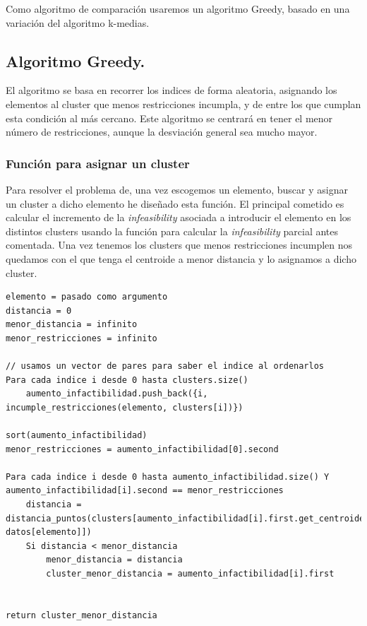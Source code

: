 \documentclass[12pt, spanish]{article}
\begin{document}
Como algoritmo de comparación usaremos un algoritmo Greedy, basado en una variación del algoritmo k-medias.

\subsection{Algoritmo Greedy.}

El algoritmo se basa en recorrer los indices de forma aleatoria, asignando los elementos al cluster que menos restricciones incumpla, y de entre los que cumplan esta condición al más cercano. Este algoritmo se centrará en tener el menor número de restricciones, aunque la desviación general sea mucho mayor.

\subsubsection{Función para asignar un cluster}

Para resolver el problema de, una vez escogemos un elemento, buscar y asignar un cluster a dicho elemento he diseñado esta función. El principal cometido es calcular el incremento de la \textit{infeasibility} asociada a introducir el elemento en los distintos clusters usando la función para calcular la \textit{infeasibility} parcial antes comentada. Una vez tenemos los clusters que menos restricciones incumplen nos quedamos con el que tenga el centroide a menor distancia y lo asignamos a dicho cluster.


\begin{lstlisting}
elemento = pasado como argumento
distancia = 0
menor_distancia = infinito
menor_restricciones = infinito

// usamos un vector de pares para saber el indice al ordenarlos
Para cada indice i desde 0 hasta clusters.size()
	aumento_infactibilidad.push_back({i, incumple_restricciones(elemento, clusters[i])})

sort(aumento_infactibilidad)
menor_restricciones = aumento_infactibilidad[0].second

Para cada indice i desde 0 hasta aumento_infactibilidad.size() Y aumento_infactibilidad[i].second == menor_restricciones
	distancia = distancia_puntos(clusters[aumento_infactibilidad[i].first.get_centroide(), datos[elemento]])
	Si distancia < menor_distancia
		menor_distancia = distancia
		cluster_menor_distancia = aumento_infactibilidad[i].first


return cluster_menor_distancia
\end{lstlisting}
\end{document}
